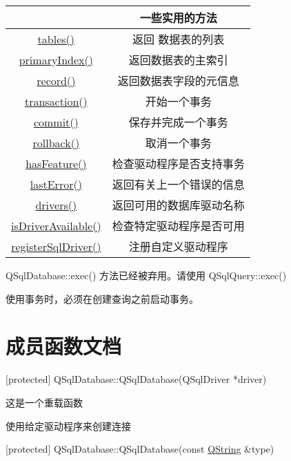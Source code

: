 \begin{tabular}{|c|c|}
	\hline	
		& 一些实用的方法\\
	\hline
	\href{https://github.com/QtDocumentCN/QtDocumentCN/blob/master/Src/S/QSqlDatabase/QSqlDatabase.md#qstringlist-qsqldatabasetablesqsqltabletype-type--qsqltables-const}{tables()} &	返回 数据表的列表\\
		\hline
	\href{https://github.com/QtDocumentCN/QtDocumentCN/blob/master/Src/S/QSqlDatabase/QSqlDatabase.md#qsqlindex-qsqldatabaseprimaryindexconst-qstring-tablename-const}{primaryIndex()} &返回数据表的主索引\\
		\hline
	\href{URL}{record()} &	返回数据表字段的元信息\\
		\hline
	\href{URL}{transaction()} &开始一个事务\\
		\hline
	\href{URL}{commit()}&	保存并完成一个事务\\
		\hline
	\href{URL}{rollback()}&	取消一个事务\\
		\hline
	\href{URL}{hasFeature()}&	检查驱动程序是否支持事务\\
		\hline
	\href{URL}{lastError()}	&返回有关上一个错误的信息\\
		\hline
	\href{URL}{drivers()}	&返回可用的数据库驱动名称\\
		\hline
	\href{URL}{isDriverAvailable()}	&检查特定驱动程序是否可用\\
		\hline
	\href{URL}{registerSqlDriver()}	&注册自定义驱动程序\\
		\hline
\end{tabular}

\begin{notice}
QSqlDatabase::exec() 方法已经被弃用。请使用 QSqlQuery::exec()
\end{notice}

\begin{notice}
使用事务时，必须在创建查询之前启动事务。
\end{notice}

\section{成员函数文档}

[protected] QSqlDatabase::QSqlDatabase(QSqlDriver *driver)

这是一个重载函数

使用给定驱动程序来创建连接

[protected] QSqlDatabase::QSqlDatabase(const \href{https://github.com/QtDocumentCN/QtDocumentCN/blob/master/Src/S/QString/QString.md}{QString} \&type)

